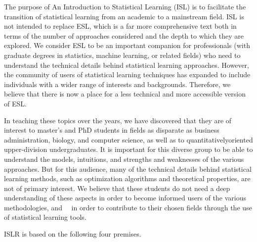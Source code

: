 \documentclass[10pt]{article}
\begin{document}
The purpose of An Introduction to Statistical Learning (ISL) is to facilitate the transition of statistical learning from an academic to a mainstream field. ISL is not intended to replace ESL, which is a far more comprehensive text both in terms of the number of approaches considered and the depth to which they are explored. We consider ESL to be an important companion for professionals (with graduate degrees in statistics, machine learning, or related fields) who need to understand the technical details behind statistical learning approaches. However, the community of users of statistical learning techniques has expanded to include individuals with a wider range of interests and backgrounds. Therefore, we believe that there is now a place for a less technical and more accessible version of ESL.

In teaching these topics over the years, we have discovered that they are of interest to master's and PhD students in fields as disparate as business administration, biology, and computer science, as well as to quantitativelyoriented upper-division undergraduates. It is important for this diverse group to be able to understand the models, intuitions, and strengths and weaknesses of the various approaches. But for this audience, many of the technical details behind statistical learning methods, such as optimization algorithms and theoretical properties, are not of primary interest. We believe that these students do not need a deep understanding of these aspects in order to become informed users of the various methodologies, and\
\
in order to contribute to their chosen fields through the use of statistical learning tools.

ISLR is based on the following four premises.
\end{document}
